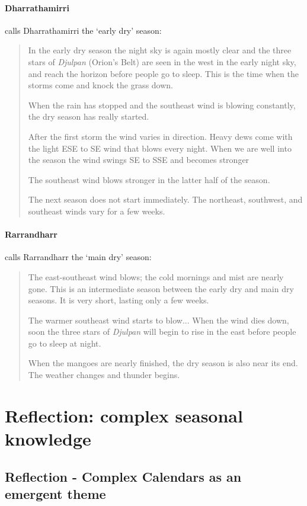 \paragraph{Dharrathamirri}

\citet{davis1989} calls Dharrathamirri the `early dry' season:
\blockquote{
    In the early dry season the night sky is again mostly clear and the three stars of
    \textit{Djulpan} (Orion's Belt) are seen in the west in the early night sky,
    and reach the horizon before people go to sleep.
    This is the time when the storms come and knock the grass down.
    
    When the rain has stopped and the southeast wind is blowing constantly, the dry season has really started.
    
    After the first storm the wind varies in direction.
    Heavy dews come with the light ESE to SE wind that blows every night.
    When we are well into the season the wind swings SE to SSE and becomes stronger
    
    The southeast wind blows stronger in the latter half of the season.
    
    The next season does not start immediately.
    The northeast, southwest, and southeast winds vary for a few weeks.
}


\paragraph{Rarrandharr}

\citet{davis1989} calls Rarrandharr the `main dry' season:
\blockquote{
    The east-southeast wind blows; the cold mornings and mist are nearly gone.
    This is an intermediate season between the early dry and main dry seasons.
    It is very short, lasting only a few weeks.
    
    The warmer southeast wind starts to blow...
    When the wind dies down, soon the three stars of \textit{Djulpan}
    will begin to rise in the east before people go to sleep at night.
    
    When the mangoes are nearly finished, the dry season is also near its end.
    The weather changes and thunder begins.
}



\section{Reflection: complex seasonal knowledge}


\subsection{Reflection - Complex Calendars as an emergent theme}

